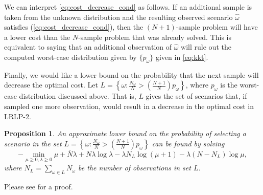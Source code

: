 \documentclass[11pt]{article}
\newtheorem{proposition}[theorem]{Proposition}
\begin{document}
We can interpret \eqref{eq:cost_decrease_cond} as follows. If an additional sample is taken from the unknown distribution and the resulting observed scenario $\hat{\omega}$ satisfies (\ref{eq:cost_decrease_cond}), then the $(N+1)$-sample problem will have a lower cost than the $N$-sample problem that was already solved.
This is equivalent to saying that an additional observation of $\hat{\omega}$ will rule out the computed worst-case distribution given by $\{p_\omega\}$ given in \eqref{eq:kkt}.

Finally, we would like a lower bound on the probability that the next sample will decrease the optimal cost.
Let $L = \left\{ \omega : \frac{N_{\omega}}{N} > \left( \frac{N+1}{N} \right) p_\omega \right\}$, where $p_\omega$ is the worst-case distribution discussed above.
That is, $L$ gives the set of scenarios that, if sampled one more observation, would result in a decrease in the optimal cost in LRLP-2.

\begin{proposition}
	An approximate lower bound on the probability of selecting a scenario in the set $L= \left\{ \omega : \frac{N_{\omega}}{N} > \left( \frac{N+1}{N} \right) p_\omega \right\}$ can be found by solving 
	\begin{equation} \label{eq:prob_cost_decrease}
		-\min_{\mu \geq 0,\lambda \geq 0} \mu + \bar{N}\lambda + N\lambda\log\lambda - \lambda N_L \log(\mu + 1) - \lambda (N-N_L) \log\mu,
	\end{equation}
	where $N_L = \sum_{\omega \in L} N_\omega$ be the number of observations in set $L$.
\end{proposition}

Please see \cite{love2013likelihood} for a proof.
\end{document}
